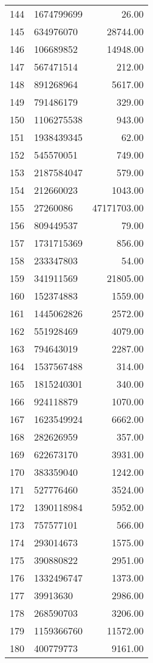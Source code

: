 \begin{table}[ht]
\begin{tabular}{rlr}
  144 & 1674799699 & 26.00 \\ 
  145 & 634976070 & 28744.00 \\ 
  146 & 106689852 & 14948.00 \\ 
  147 & 567471514 & 212.00 \\ 
  148 & 891268964 & 5617.00 \\ 
  149 & 791486179 & 329.00 \\ 
  150 & 1106275538 & 943.00 \\ 
  151 & 1938439345 & 62.00 \\ 
  152 & 545570051 & 749.00 \\ 
  153 & 2187584047 & 579.00 \\ 
  154 & 212660023 & 1043.00 \\ 
  155 & 27260086 & 47171703.00 \\ 
  156 & 809449537 & 79.00 \\ 
  157 & 1731715369 & 856.00 \\ 
  158 & 233347803 & 54.00 \\ 
  159 & 341911569 & 21805.00 \\ 
  160 & 152374883 & 1559.00 \\ 
  161 & 1445062826 & 2572.00 \\ 
  162 & 551928469 & 4079.00 \\ 
  163 & 794643019 & 2287.00 \\ 
  164 & 1537567488 & 314.00 \\ 
  165 & 1815240301 & 340.00 \\ 
  166 & 924118879 & 1070.00 \\ 
  167 & 1623549924 & 6662.00 \\ 
  168 & 282626959 & 357.00 \\ 
  169 & 622673170 & 3931.00 \\ 
  170 & 383359040 & 1242.00 \\ 
  171 & 527776460 & 3524.00 \\ 
  172 & 1390118984 & 5952.00 \\ 
  173 & 757577101 & 566.00 \\ 
  174 & 293014673 & 1575.00 \\ 
  175 & 390880822 & 2951.00 \\ 
  176 & 1332496747 & 1373.00 \\ 
  177 & 39913630 & 2986.00 \\ 
  178 & 268590703 & 3206.00 \\ 
  179 & 1159366760 & 11572.00 \\ 
  180 & 400779773 & 9161.00 \\ 

\end{tabular}
\end{table}
